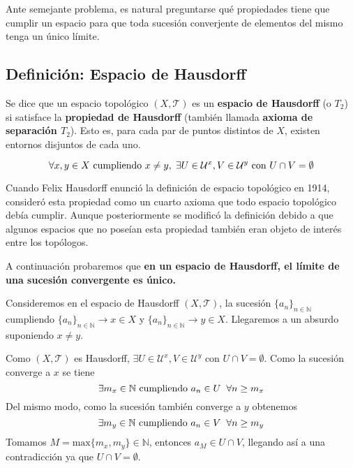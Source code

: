 \documentclass{article}
\begin{document}
\begin{justify} Ante semejante problema, es natural preguntarse qué
  propiedades tiene que cumplir un espacio para que toda sucesión
  converjente de elementos del mismo tenga un único límite.
\end{justify}

\subsection*{Definición: Espacio de Hausdorff}

\begin{justify} Se dice que un espacio topológico $(X, \mathcal{T})$
  es un \textbf{espacio de Hausdorff} (o $T_2$) si satisface la
  \textbf{propiedad de Hausdorff} (también llamada \textbf{axioma de
  separación $T_2$}). Esto es, para cada par de puntos distintos de
  $X$, existen entornos disjuntos de cada uno.

  \[\forall x, y \in X \text{ cumpliendo } x \neq y, \hspace{1mm}
    \exists U \in \mathcal{U}^x, V \in \mathcal{U}^y \text{ con } U
    \cap V = \emptyset\]
\end{justify}

\begin{justify} Cuando Felix Hausdorff enunció la definición de
  espacio topológico en 1914, consideró esta propiedad como un cuarto
  axioma que todo espacio topológico debía cumplir. Aunque
  posteriormente se modificó la definición debido a que algunos
  espacios que no poseían esta propiedad también eran objeto de
  interés entre los topólogos.
\end{justify}

\begin{justify} A continuación probaremos que \textbf{en un espacio de
    Hausdorff, el límite de una sucesión convergente es único.}
\end{justify}

\begin{justify} Consideremos en el espacio de Hausdorff
  $(X, \mathcal{T})$, la sucesión $\{a_n\}_{n \in \mathbb{N}}$
  cumpliendo $\{a_n\}_{n \in \mathbb{N}} \longrightarrow x \in X$ y
  $\{a_n\}_{n \in \mathbb{N}} \longrightarrow y \in X$. Llegaremos a
  un absurdo suponiendo $x \neq y$.
\end{justify}

\begin{justify} Como $(X, \mathcal{T})$ es Hausdorff, $\exists U \in
  \mathcal{U}^x, V \in \mathcal{U}^y$ con $U \cap V = \emptyset$. Como
  la sucesión converge a $x$ se tiene
  \[\exists m_x \in \mathbb{N} \text{ cumpliendo } a_n \in U
    \hspace{2mm} \forall n \geq m_x\] Del mismo modo, como la sucesión
  también converge a $y$ obtenemos
  \[\exists m_y \in \mathbb{N} \text{ cumpliendo } a_n \in V
    \hspace{2mm} \forall n \geq m_y\] Tomamos
  $M = \text{max}\{m_x, m_y\} \in \mathbb{N}$, entonces
  $a_M \in U \cap V$, llegando así a una contradicción ya que
  $U \cap V = \emptyset$.
\end{justify}
\end{document}
